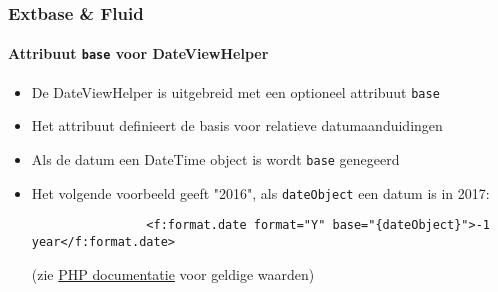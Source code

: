 
\begin{frame}[fragile]
	\frametitle{Extbase \& Fluid}
	\framesubtitle{Attribuut \texttt{base} voor DateViewHelper}


	\begin{itemize}

		\item De DateViewHelper is uitgebreid met een optioneel attribuut \texttt{base}
		\item Het attribuut definieert de basis voor relatieve datumaanduidingen
		\item Als de datum een DateTime object is wordt \texttt{base} genegeerd
		\item Het volgende voorbeeld geeft "2016", als \texttt{dateObject} een datum is in 2017:

			\begin{lstlisting}
				<f:format.date format="Y" base="{dateObject}">-1 year</f:format.date>
			\end{lstlisting}

		\small
			(zie \href{http://www.php.net/manual/en/datetime.formats.relative.php}{PHP documentatie} voor geldige waarden)
		\normalsize

	\end{itemize}

\end{frame}


